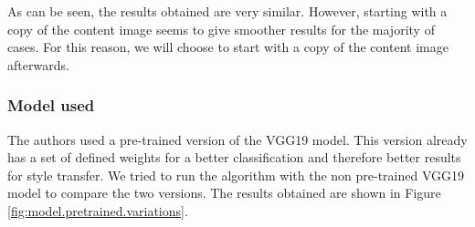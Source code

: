 \documentclass[twocolumn,superscriptaddress,aps, floatfix]{revtex4-1}
\begin{document}
    As can be seen, the results obtained are very similar. However, starting with a copy of the content image seems to give smoother results for the majority of cases. For this reason, we will choose to start with a copy of the content image afterwards.
    
    \subsubsection{Model used}
    
    The authors used a pre-trained version of the VGG19 model. This version already has a set of defined weights for a better classification and therefore better results for style transfer. We tried to run the algorithm with the non pre-trained VGG19 model to compare the two versions. The results obtained are shown in Figure \ref{fig:model.pretrained.variations}.
    
\end{document}

